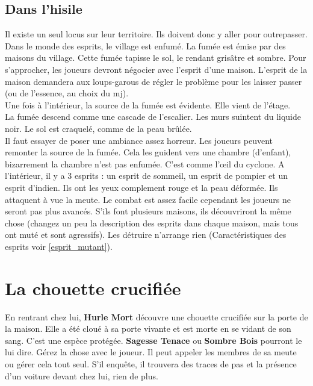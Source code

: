 \documentclass[oneside,12pt]{book}
\newcommand{\Jessica}{\textbf{Sagesse Tenace} }
\newcommand{\Peter}{\textbf{Hurle Mort} }
\newcommand{\Leonard}{\textbf{Sombre Bois} }
\begin{document}
\begin{flushleft}
\subsection{Dans l'hisile}
\label{hisile_enquete}
Il existe un seul locus sur leur territoire. Ils doivent donc y aller pour outrepasser.
Dans le monde des esprits, le village est enfumé. La fumée est émise par des maisons du village. 
Cette fumée tapisse le sol, le rendant grisâtre et sombre.
Pour s'approcher, les joueurs devront négocier avec l'esprit d'une maison. 
L'esprit de la maison demandera aux loups-garous de régler le problème pour les laisser passer 
(ou de l'essence, au choix du mj).\\
Une fois à l'intérieur, la source de la fumée est évidente. Elle vient de l'étage.\\
La fumée descend comme une cascade de l'escalier. Les murs suintent du liquide noir. 
Le sol est craquelé, comme de la peau brûlée.\\
Il faut essayer de poser une ambiance assez horreur. Les joueurs peuvent remonter la source de la fumée. 
Cela les guident vers une chambre (d'enfant), bizarrement la chambre n'est pas enfumée. 
C'est comme l’œil du cyclone. A l'intérieur, il y a 3 esprits : un esprit de sommeil, un esprit de pompier et un esprit d'indien.
Ils ont les yeux complement rouge et la peau déformée. Ils attaquent à vue la meute. 
Le combat est assez facile cependant les joueurs ne seront pas plus avancés. 
S'ils font plusieurs maisons, ils découvriront la même chose 
(changez un peu la description des esprits dans chaque maison, mais tous ont muté et sont agressifs). 
Les détruire n'arrange rien (Caractéristiques des esprits voir \ref{esprit_mutant}). 

\section{La chouette crucifiée}
\label{chouette}
En rentrant chez lui, \Peter découvre une chouette crucifiée sur la porte de la maison. Elle a été cloué à sa porte vivante et est morte en se vidant de son sang. C'est une espèce protégée. \Jessica ou \Leonard pourront le lui dire. Gérez la chose avec le joueur. Il peut appeler les membres de sa meute ou gérer cela tout seul. S'il enquête, il trouvera des traces de pas et la présence d'un voiture devant chez lui, rien de plus.


\end{flushleft}
\end{document}
